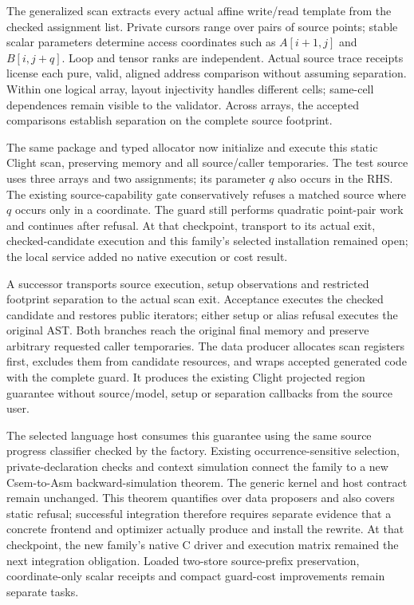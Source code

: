 The generalized scan extracts every actual affine write/read template from the
checked assignment list. Private cursors range over pairs of source points;
stable scalar parameters determine access coordinates such as $A[i+1,j]$ and
$B[i,j+q]$. Loop and tensor ranks are independent. Actual source trace receipts
license each pure, valid, aligned address comparison without assuming
separation. Within one logical array, layout injectivity handles different
cells; same-cell dependences remain visible to the validator. Across arrays,
the accepted comparisons establish separation on the complete source footprint.

The same package and typed allocator now initialize and execute this static
Clight scan, preserving memory and all source/caller temporaries. The test
source uses three arrays and two assignments; its parameter $q$ also occurs
in the RHS. The existing source-capability gate conservatively refuses a
matched source where $q$ occurs only in a coordinate. The guard still performs
quadratic point-pair work and continues after refusal. At that checkpoint,
transport to its actual exit, checked-candidate execution and this family's
selected installation remained open; the local service added no native
execution or cost result.

A successor transports source execution, setup observations and restricted
footprint separation to the actual scan exit. Acceptance executes the checked
candidate and restores public iterators; either setup or alias refusal executes
the original AST. Both branches reach the original final memory and preserve
arbitrary requested caller temporaries. The data producer allocates scan
registers first, excludes them from candidate resources, and wraps accepted
generated code with the complete guard. It produces the existing Clight
projected region guarantee without source/model, setup or separation callbacks
from the source user.

The selected language host consumes this guarantee using the same source
progress classifier checked by the factory. Existing occurrence-sensitive
selection, private-declaration checks and context simulation connect the family
to a new Csem-to-Asm backward-simulation theorem. The generic kernel and host
contract remain unchanged. This theorem quantifies over data proposers and also
covers static refusal; successful integration therefore requires separate
evidence that a concrete frontend and optimizer actually produce and install
the rewrite. At that checkpoint, the new family's native C driver and execution
matrix remained the next integration obligation. Loaded two-store source-prefix preservation,
coordinate-only scalar receipts and compact guard-cost improvements remain
separate tasks.

